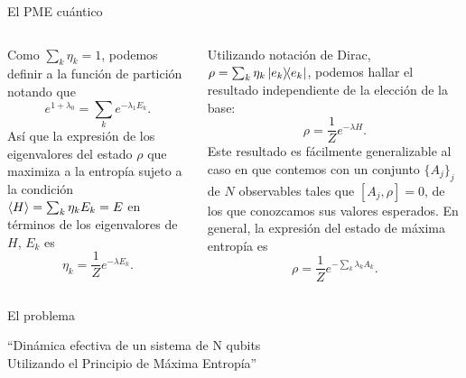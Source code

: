 \begin{frame}{El PME cuántico}
   \begin{columns}
    \begin{column}{0.5\textwidth}
        Como $\sum_{k}\eta_{k}=1$, podemos definir a la función de partición notando que
        \begin{equation}
            e^{1+\lambda_{0}}=\sum_{k}e^{-\lambda_{1}E_{k}}.\nonumber
        \end{equation}
Así que la expresión de los eigenvalores del estado $\rho$ que maximiza a la entropía sujeto a la condición $\expval{H}=\sum_{k}\eta_{k}E_{k}=E$ en términos de los eigenvalores de $H$, $E_{k}$ es
\begin{equation}
\eta_{k}=\frac{1}{Z}e^{-\lambda E_{k}}.\nonumber
\end{equation}
    \end{column}
    \begin{column}{0.5\textwidth}
Utilizando notación de Dirac, $\rho=\sum_{k}\eta_{k}\dyad{e_{k}}$, podemos hallar el resultado independiente de la elección de la base:
\begin{equation}
    \rho=\frac{1}{Z}e^{-\lambda H}.
\end{equation}
Este resultado es fácilmente generalizable al caso en que contemos con un  conjunto $\{A_{j}\}_{j}$ de $N$ observables tales que $[A_{j},\rho]=0$, de los que conozcamos sus valores esperados. En general, la expresión del estado de máxima entropía es
\begin{equation}\label{eq:GeneralMaxEnt}
    \rho=\frac{1}{Z}e^{-\sum_{k}\lambda_{k} A_{k}}.
\end{equation}
    \end{column}
   \end{columns}
\end{frame}


\begin{frame}{El problema}
    \begin{center}
        ``Dinámica efectiva de un sistema de N qubits\\
        Utilizando el Principio de Máxima Entropía''
    \end{center}
\end{frame}